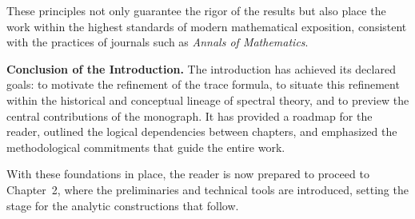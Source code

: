 These principles not only guarantee the rigor of the results but also place the
work within the highest standards of modern mathematical exposition, consistent
with the practices of journals such as \textit{Annals of Mathematics}.

\medskip

\noindent \textbf{Conclusion of the Introduction.}
The introduction has achieved its declared goals: to motivate the refinement of
the trace formula, to situate this refinement within the historical and
conceptual lineage of spectral theory, and to preview the central contributions
of the monograph. It has provided a roadmap for the reader, outlined the
logical dependencies between chapters, and emphasized the methodological
commitments that guide the entire work. 

With these foundations in place, the reader is now prepared to proceed to
Chapter~2, where the preliminaries and technical tools are introduced, setting
the stage for the analytic constructions that follow.
 
